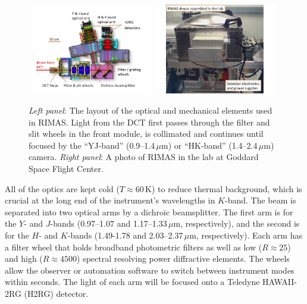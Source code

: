 \documentclass[letterpaper,11pt]{article}
\begin{document}
\begin{figure}[tp!]
\begin{center}
\hbox{
\includegraphics[width=0.47\textwidth]{figures/slide3.jpg}
\hspace{0.5cm}
\includegraphics[width=0.47\textwidth]{figures/slide4.jpg}
}
\vspace{-0.7cm}
\end{center}
\caption{\footnotesize
{{\it Left panel}: The layout of the optical and mechanical elements used in RIMAS.
Light from the DCT first passes through the filter and slit wheels in the 
front module, is collimated and continues until focused by the ``YJ-band'' 
(0.9--1.4\,$\mu$m) or ``HK-band'' (1.4--2.4\,$\mu$m) camera.
{\it Right panel}: A photo of RIMAS in the lab at Goddard Space Flight Center.}}
\label{fig2}
\end{figure}

All of the optics are kept cold ($T \approx 60$\,K) to reduce 
thermal background, which is crucial at the long end of the instrument’s 
wavelengths in $K$-band. The beam is separated into two optical arms by a
dichroic beamsplitter. The first arm is for the $Y$- and $J$-bands 
(0.97--1.07 and 1.17--1.33\,$\mu$m, respectively), and the second is for the $H$- 
and $K$-bands (1.49-1.78 and 2.03--2.37\,$\mu$m, respectively). Each 
arm has a filter wheel that holds broadband photometric filters as well as low ($R \approx
25$) and high ($R \approx 4500$) spectral resolving power diffractive elements. 
The wheels allow the observer or automation software to switch between instrument modes 
within seconds.  The light of each arm will be focused onto a Teledyne HAWAII-2RG (H2RG) detector.
\end{document}
